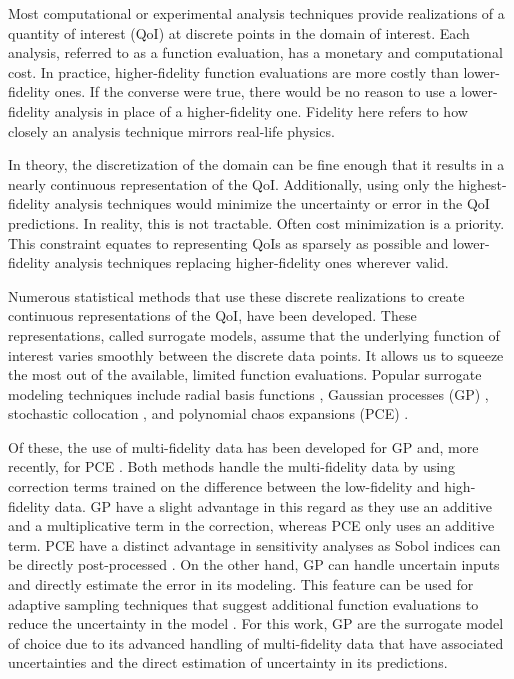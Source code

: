 Most computational or experimental analysis techniques provide realizations of a quantity of interest (QoI) at discrete points in the domain of interest. 
Each analysis, referred to as a function evaluation, has a monetary and computational cost. 
In practice, higher-fidelity function evaluations are more costly than lower-fidelity ones.
If the converse were true, there would be no reason to use a lower-fidelity analysis in place of a higher-fidelity one.
Fidelity here refers to how closely an analysis technique mirrors real-life physics. 

In theory, the discretization of the domain can be fine enough that it results in a nearly continuous representation of the QoI.
Additionally, using only the highest-fidelity analysis techniques would minimize the uncertainty or error in the QoI predictions. 
In reality, this is not tractable. 
Often cost minimization is a priority. 
This constraint equates to representing QoIs as sparsely as possible and lower-fidelity analysis techniques replacing higher-fidelity ones wherever valid.  

Numerous statistical methods that use these discrete realizations to create continuous representations of the QoI, have been developed.
These representations, called surrogate models, assume that the underlying function of interest varies smoothly between the discrete data points.
It allows us to squeeze the most out of the available, limited function evaluations.
Popular surrogate modeling techniques include radial basis functions \cite{park1991universal}, Gaussian processes (GP) \cite{krige1951statistical,matheron1963principles,rasmussen_gaussian_2006}, stochastic collocation \cite{loeven2007probabilistic}, and polynomial chaos expansions (PCE) \cite{oladyshkin2012data,blatman2011adaptive}.

Of these, the use of multi-fidelity data has been developed for GP \cite{kennedy_predicting_2000,gratiet_multi-fidelity_nodate} and, more recently, for PCE \cite{ng2012multifidelity, palar2018global}.
Both methods handle the multi-fidelity data by using correction terms trained on the difference between the low-fidelity and high-fidelity data.
GP have a slight advantage in this regard as they use an additive and a multiplicative term in the correction, whereas PCE only uses an additive term. 
PCE have a distinct advantage in sensitivity analyses as Sobol indices can be directly post-processed \cite{sudret2008global,crestaux2009polynomial}.
On the other hand, GP can handle uncertain inputs and directly estimate the error in its modeling.
This feature can be used for adaptive sampling techniques that suggest additional function evaluations to reduce the uncertainty in the model \cite{xu2011adaptive}.
For this work, GP are the surrogate model of choice due to its advanced handling of multi-fidelity data that have associated uncertainties and the direct estimation of uncertainty in its predictions.

